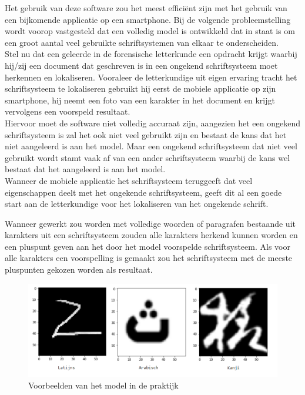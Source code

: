 Het gebruik van deze software zou het meest efficiënt zijn met het gebruik van een bijkomende applicatie op een smartphone.
Bij de volgende probleemstelling wordt voorop vastgesteld dat een volledig model is ontwikkeld dat in staat is om een groot aantal veel gebruikte schriftsystemen van elkaar te onderscheiden. \\
Stel nu dat een geleerde in de forensische letterkunde een opdracht krijgt waarbij hij/zij een document dat geschreven is in een ongekend schriftsysteem moet herkennen en lokaliseren. Vooraleer de letterkundige uit eigen ervaring tracht het schriftsysteem te lokaliseren gebruikt hij eerst de mobiele applicatie op zijn smartphone, hij neemt een foto van een karakter in het document en krijgt vervolgens een voorspeld resultaat. \\
Hiervoor moet de software niet volledig accuraat zijn, aangezien het een ongekend schriftsysteem is zal het ook niet veel gebruikt zijn en bestaat de kans dat het niet aangeleerd is aan het model.
Maar een ongekend schriftsysteem dat niet veel gebruikt wordt stamt vaak af van een ander schriftsysteem waarbij de kans wel bestaat dat het aangeleerd is aan het model. \\
Wanneer de mobiele applicatie het schriftsysteem teruggeeft dat veel eigenschappen deelt met het ongekende schriftsysteem, geeft dit al een goede start aan de letterkundige voor het lokaliseren van het ongekende schrift.

Wanneer gewerkt zou worden met volledige woorden of paragrafen bestaande uit karakters uit een schriftsysteem zouden alle karakters herkend kunnen worden en een pluspunt geven aan het door het model voorspelde schriftsysteem.
Als voor alle karakters een voorspelling is gemaakt zou het schriftsysteem met de meeste pluspunten gekozen worden als resultaat.

 
\begin{figure}
    
    
    \includegraphics[width=\linewidth]{img/voorbeelden.png}
    \caption{Voorbeelden van het model in de praktijk}
    \label{tab:examples}

\end{figure}









 














